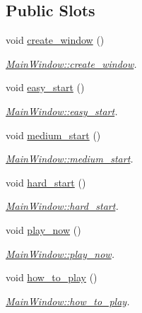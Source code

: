 \subsection*{Public Slots}
\begin{DoxyCompactItemize}
\item 
void \hyperlink{class_main_window_a6e9c06fdd9831067d3b105cc194b743f}{create\+\_\+window} ()
\begin{DoxyCompactList}\small\item\em \hyperlink{class_main_window_a6e9c06fdd9831067d3b105cc194b743f}{Main\+Window\+::create\+\_\+window}. \end{DoxyCompactList}\item 
void \hyperlink{class_main_window_a6975d2ab387dbf9f73bf89b11d86c9c2}{easy\+\_\+start} ()
\begin{DoxyCompactList}\small\item\em \hyperlink{class_main_window_a6975d2ab387dbf9f73bf89b11d86c9c2}{Main\+Window\+::easy\+\_\+start}. \end{DoxyCompactList}\item 
void \hyperlink{class_main_window_a4bd1655edcbf504202c1822d99960aa1}{medium\+\_\+start} ()
\begin{DoxyCompactList}\small\item\em \hyperlink{class_main_window_a4bd1655edcbf504202c1822d99960aa1}{Main\+Window\+::medium\+\_\+start}. \end{DoxyCompactList}\item 
void \hyperlink{class_main_window_a2f94225be5a4e3d17feba6630c0b2e3c}{hard\+\_\+start} ()
\begin{DoxyCompactList}\small\item\em \hyperlink{class_main_window_a2f94225be5a4e3d17feba6630c0b2e3c}{Main\+Window\+::hard\+\_\+start}. \end{DoxyCompactList}\item 
void \hyperlink{class_main_window_a1f2fc891d85eda505b42a3e9026a56b0}{play\+\_\+now} ()
\begin{DoxyCompactList}\small\item\em \hyperlink{class_main_window_a1f2fc891d85eda505b42a3e9026a56b0}{Main\+Window\+::play\+\_\+now}. \end{DoxyCompactList}\item 
void \hyperlink{class_main_window_a634ca0053d9438de38975a7f8ee20a63}{how\+\_\+to\+\_\+play} ()
\begin{DoxyCompactList}\small\item\em \hyperlink{class_main_window_a634ca0053d9438de38975a7f8ee20a63}{Main\+Window\+::how\+\_\+to\+\_\+play}. \end{DoxyCompactList}\end{DoxyCompactItemize}
